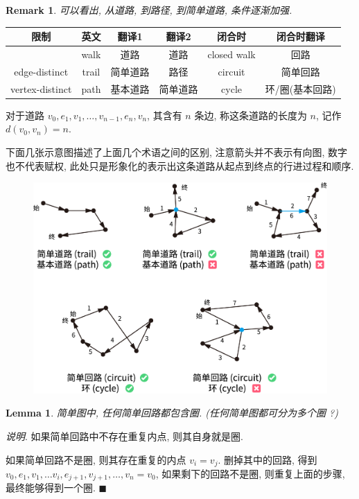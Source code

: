 \documentclass[UTF8]{ctexart}
\theoremstyle{mystyle}
\newtheorem{lemma}{Lemma}[section]
\theoremstyle{myremark}
\newtheorem*{remark}{Remark}
\theoremstyle{plain}
\newenvironment{explanation}{\textit{说明}.}{\hfill$\blacksquare$}
\begin{document}
\begin{remark}
    可以看出, 从道路, 到路径, 到简单道路, 条件逐渐加强. 
\end{remark}

\begin{table}[H]
    \centering
    \begin{tabular}{c|ccc|cc}
        限制 & 英文 & 翻译1 & 翻译2 & 闭合时 & 闭合时翻译 \\ \hline
            & walk & 道路 & 道路 & closed walk & 回路 \\ \hline
        edge-distinct & trail & 简单道路 & 路径 & circuit & 简单回路 \\ \hline
        vertex-distinct & path & 基本道路 & 简单道路 & cycle & 环/圈(基本回路)
    \end{tabular}
\end{table}

对于道路 $ v_0, e_1, v_1, \dots, v_{n - 1}, e_n, v_n $, 其含有 $ n $ 条边, 称这条道路的长度为 $ n $, 记作 $ d(v_0, v_n) = n $.

下面几张示意图描述了上面几个术语之间的区别, 注意箭头并不表示有向图, 数字也不代表赋权, 此处只是形象化的表示出这条道路从起点到终点的行进过程和顺序.
\begin{figure}[H]
    \centering
    \includegraphics[width = 0.9\linewidth]{./images/walks.png}
\end{figure}


\begin{lemma}
    简单图中, 任何简单回路都包含圈. (任何简单图都可分为多个圈 ?)
\end{lemma}

\begin{explanation}
    如果简单回路中不存在重复内点, 则其自身就是圈.

    如果简单回路不是圈, 则其存在重复的内点 $ v_i = v_j $. 删掉其中的回路, 得到 $ v_0, e_1, v_1, \dots v_i, e_{j + 1}, v_{j + 1}, \dots, v_{n} = v_0 $, 如果剩下的回路不是圈, 则重复上面的步骤, 最终能够得到一个圈. 
\end{explanation}
\end{document}
